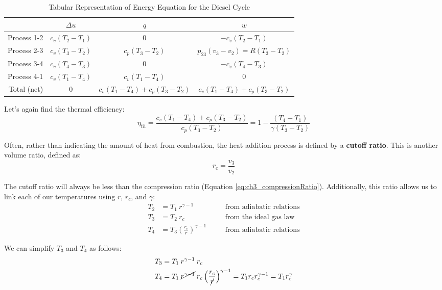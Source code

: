 \begin{table}[H]
  \centering
\def\arraystretch{1.5}
\caption{Tabular Representation of Energy Equation for the Diesel Cycle}
\label{tab:ch3_diesel}
\begin{tabular}{r|ccc}
            & $\Delta u$        & $q$             & $w$           \\ \hline
Process 1-2 & $ c_v (T_2-T_1)$ & 0                 &  $ -c_v (T_2-T_1)$ \\
Process 2-3 & $ c_v (T_3-T_2)$ & $ c_p (T_3-T_2)$   & $p_{23} (v_3 - v_2) = R(T_3-T_2)$ \\
Process 3-4 & $ c_v (T_4-T_3)$ & 0                 &  $ -c_v (T_4-T_3)$ \\ 
Process 4-1 & $ c_v (T_1-T_4)$ & $ c_v (T_1-T_4)$  &  0          \\ \hhline{=|===}
Total (net) & 0                 & $c_v (T_1-T_4)+c_p(T_3-T_2)$ & $c_v (T_1-T_4) + c_p(T_3-T_2)$
\end{tabular}
\def\arraystretch{1.0}
\end{table}

Let's again find the thermal efficiency:
\begin{equation*}
  \eta_{th} = \frac{c_v \left(T_1-T_4\right)+c_p\left(T_3-T_2\right)}{ c_p \left(T_3-T_2\right)} = 1-\frac{\left(T_4-T_1\right)}{\gamma \left(T_3-T_2\right)}
\end{equation*}

Often, rather than indicating the amount of heat from combustion, the heat addition process is defined by a {\bf cutoff ratio}.  This is another volume ratio, defined as:
\begin{equation} \label{eq:ch3_cutoffRatio}
  r_c = \frac{v_3}{v_2}
\end{equation}

The cutoff ratio will always be less than the compression ratio (Equation \ref{eq:ch3_compressionRatio}).  Additionally, this ratio allows us to link each of our temperatures using $r$, $r_c$, and $\gamma$:
\begin{align*}
  T_2 &= T_1\: r^{\gamma-1}  &\quad& \text{from adiabatic relations}\\
  T_3 &= T_2\: r_c &\quad& \text{from the ideal gas law}\\
  T_4 &= T_3 \left(\frac{r_c}{r}\right)^{\gamma-1} &\quad& \text{from adiabatic relations}
\end{align*}

We can simplify $T_3$ and $T_4$ as follows:
\begin{align*}
  T_3 &= T_1\: r^{\gamma-1}\: r_c \\
  T_4 &= T_1\: \cancel{r^{\gamma-1}}\: r_c \left(\frac{r_c}{\cancel{r}}\right)^{\gamma-1} = T_1 r_c r_c^{\gamma-1} = T_1 r_c^{\gamma}
\end{align*}

